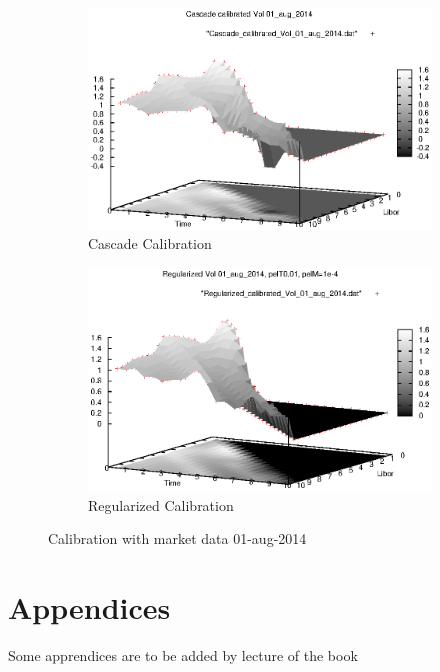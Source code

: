 \documentclass[a4paper,10pt]{article}
\begin{document}
\begin{figure}[h]
\begin{subfigure}{.5\textwidth}
  \centering
  \includegraphics[scale=0.5]{Cascade_calibrated_Vol_01_aug_2014}
  \caption{Cascade Calibration}
  \label{fig:cascade_calibration_mkt}
\end{subfigure}%
\begin{subfigure}{.5\textwidth}
  \centering
  \includegraphics[scale=0.5]{Regularized_calibrated_Vol_01_aug_2014}
  \caption{Regularized Calibration}
  \label{fig:regularized_calibration_mkt}
\end{subfigure}
\caption{Calibration with market data 01-aug-2014}
\label{fig:calibration_mkt}
\end{figure}

\newpage
\section{Appendices}
\appendix
Some apprendices are to be added by lecture of the book ~\cite{BRIGO2006}
\end{document}
